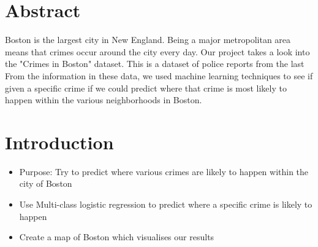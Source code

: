 \documentclass[a0,landscape]{a0poster}
\let\Section=\section
\def\section{\setcounter{equation}{0}\Section}
\newcommand{\1}{\bold{1}}
\begin{document}
\begin{multicols}{3} %

\vspace{0.05cm} %




\section*{Abstract}
Boston is the largest city in New England. Being a major metropolitan area means that crimes occur around the city every day. Our project takes a look into the "Crimes in Boston" dataset. This is a dataset of police reports from the last From the information in these data, we used machine learning techniques to see if given a specific crime if we could predict where that crime is most likely to happen within the various neighborhoods in Boston. 



\color{SaddleBrown} %




\color{black}\section{Introduction}
\begin{itemize}
\item Purpose: Try to predict where various crimes are likely to happen within the city of Boston
\item Use Multi-class logistic regression to predict where a specific crime is likely to happen
\item Create a map of Boston which visualises our results 
\end{itemize}
\columnsep=5pt
\columnseprule=0pt




\end{multicols}
\end{document}
